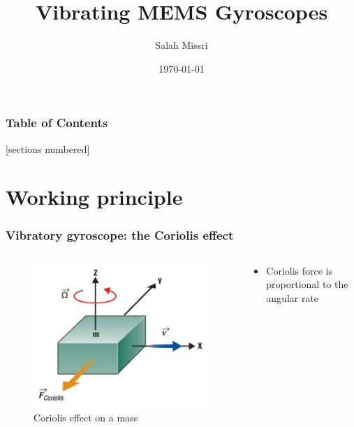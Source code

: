 \documentclass[10pt]{beamer}
\title{Vibrating {\rmfamily\textsc{MEMS}} Gyroscopes}
\date{\today}
\author{Salah Missri}
\institute{EPFL}
\begin{document}
\maketitle

\begin{frame}
  \frametitle{Table of Contents}
  [sections numbered]
  \tableofcontents[hideallsubsections]
\end{frame}

\section{Working principle}

\begin{frame}
\frametitle{Vibratory gyroscope: the Coriolis effect}
\begin{columns}
    \begin{column}{.48\textwidth}
        \begin{figure}
            \centering
            \includegraphics[width=1.\linewidth]{coriolis1.png}
            \caption{Coriolis effect on a mass\cite{MEMSblog}}
        \end{figure}
    \end{column}
    \hfill
    \begin{column}{.60\textwidth}
        \begin{itemize}
            \item Coriolis force is proportional to the angular rate
            \begin{equation*}

\end{equation*}
\end{itemize}
\end{column}
\end{columns}
\end{frame}
\end{document}
